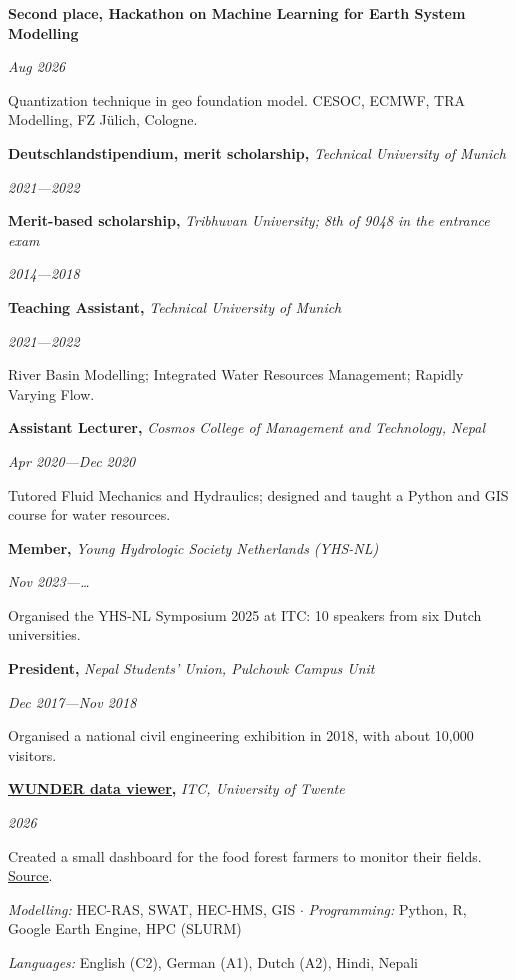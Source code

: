 \documentclass[10pt,letterpaper]{article}
\newcommand{\ulink}[2]{\href{#1}{\uline{#2}}}
\newlength{\cvlabelwidth}
\newenvironment{cvsection}[1]{%
  \begin{list}{}{%
    \setlength{\leftmargin}{\cvlabelwidth}%
    \addtolength{\leftmargin}{0.12in}%
    \setlength{\labelwidth}{\cvlabelwidth}%
    \setlength{\labelsep}{0.12in}%
    \setlength{\itemindent}{0pt}%
    \setlength{\listparindent}{0pt}%
    \setlength{\topsep}{0.02in}%
    \setlength{\parsep}{0pt}%
    \setlength{\itemsep}{0pt}%
    \renewcommand{\makelabel}[1]{%
      \parbox[t]{\cvlabelwidth}{\raggedright\textcolor{cvblue}{\textsc{##1}}}}%
  }%
  \item[#1]%
}{\end{list}}
\newcommand{\entry}[3]{%
  \noindent
  \begin{minipage}[t]{0.72\linewidth}\raggedright\textbf{#1}\textit{#2}\end{minipage}%
  \hfill
  \begin{minipage}[t]{0.26\linewidth}\raggedleft\textit{#3}\end{minipage}%
  \par
}
\newcommand{\detail}[1]{%
  \hspace*{0.55em}\textendash\hspace{0.4em}%
  \parbox[t]{\dimexpr\linewidth-1.75em}{\raggedright #1}\par}
\newcommand{\gap}{\vspace{0.02in}}
\begin{document}
\begin{cvsection}{Awards}
  \entry{Second place, Hackathon on Machine Learning for Earth System Modelling}{}{Aug 2026}
  \detail{Quantization technique in geo foundation model. CESOC, ECMWF, TRA Modelling,
          FZ Jülich, Cologne.}
\end{cvsection}

\begin{cvsection}{Scholarships}
  \entry{Deutschlandstipendium, merit scholarship, }{Technical University of Munich}{2021---2022}
  \gap
  \entry{Merit-based scholarship, }{Tribhuvan University\textup{; 8th of 9048 in the entrance exam}}{2014---2018}
\end{cvsection}

\begin{cvsection}{Teaching}
  \entry{Teaching Assistant, }{Technical University of Munich}{2021---2022}
  \detail{River Basin Modelling; Integrated Water Resources Management; Rapidly Varying Flow.}
  \gap
  \entry{Assistant Lecturer, }{Cosmos College of Management and Technology, Nepal}{Apr 2020---Dec 2020}
  \detail{Tutored Fluid Mechanics and Hydraulics; designed and taught a Python and GIS
          course for water resources.}
\end{cvsection}

\begin{cvsection}{Volunteering}
  \entry{Member, }{Young Hydrologic Society Netherlands (YHS-NL)}{Nov 2023---\ldots}
  \detail{Organised the YHS-NL Symposium 2025 at ITC: 10 speakers from six Dutch universities.}
  \gap
  \entry{President, }{Nepal Students' Union, Pulchowk Campus Unit}{Dec 2017---Nov 2018}
  \detail{Organised a national civil engineering exhibition in 2018, with about 10,000 visitors.}
\end{cvsection}

\begin{cvsection}{Software}
  \entry{\ulink{https://wunder-project.streamlit.app}{WUNDER data viewer}, }{ITC, University of Twente}{2026}
  \detail{Created a small dashboard for the food forest farmers to monitor their fields.
          \ulink{https://github.com/prajzwal08/wunder-project}{Source}.}
\end{cvsection}

\begin{cvsection}{Skills}
  \textit{Modelling:} HEC-RAS, SWAT, HEC-HMS, GIS $\cdot$
  \textit{Programming:} Python, R, Google Earth Engine, HPC (SLURM)\par
  \textit{Languages:} English (C2), German (A1), Dutch (A2), Hindi, Nepali\par
\end{cvsection}
\end{document}
